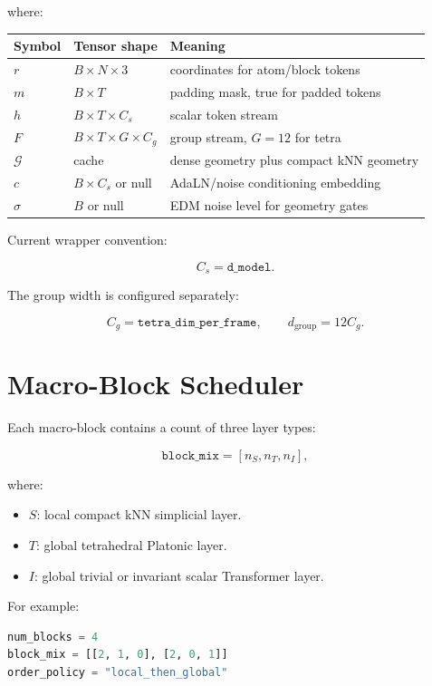 \documentclass[11pt]{article}
\begin{document}
where:

\begin{center}
\begin{tabular}{lll}
\toprule
Symbol & Tensor shape & Meaning \\
\midrule
\(r\) & \(B\times N\times 3\) & coordinates for atom/block tokens \\
\(m\) & \(B\times T\) & padding mask, true for padded tokens \\
\(h\) & \(B\times T\times C_s\) & scalar token stream \\
\(F\) & \(B\times T\times G\times C_g\) & group stream, \(G=12\) for tetra \\
\(\mathcal{G}\) & cache & dense geometry plus compact kNN geometry \\
\(c\) & \(B\times C_s\) or null & AdaLN/noise conditioning embedding \\
\(\sigma\) & \(B\) or null & EDM noise level for geometry gates \\
\bottomrule
\end{tabular}
\end{center}

Current wrapper convention:

\[
  C_s = \texttt{d\_model}.
\]

The group width is configured separately:

\[
  C_g = \texttt{tetra\_dim\_per\_frame},
  \qquad
  d_{\mathrm{group}} = 12 C_g.
\]

\section{Macro-Block Scheduler}

Each macro-block contains a count of three layer types:

\[
\texttt{block\_mix}
=
[n_S,n_T,n_I],
\]

where:

\begin{itemize}[leftmargin=1.5em]
  \item \(S\): local compact kNN simplicial layer.
  \item \(T\): global tetrahedral Platonic layer.
  \item \(I\): global trivial or invariant scalar Transformer layer.
\end{itemize}

For example:

\begin{lstlisting}[language=Python]
num_blocks = 4
block_mix = [[2, 1, 0], [2, 0, 1]]
order_policy = "local_then_global"
\end{lstlisting}
\end{document}
